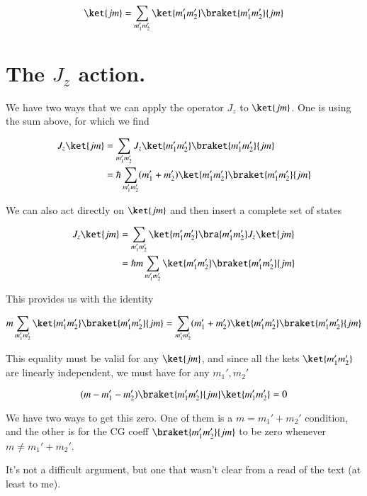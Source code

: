 \begin{equation}\label{eqn:ClebshGordan:70}
\ket{jm} = \sum_{m_1' m_2'} \ket{m_1' m_2'} \braket{m_1' m_2'}{jm}
\end{equation}

\section{The $J_z$ action.}

We have two ways that we can apply the operator $J_z$ to $\ket{jm}$.  One is using the sum above, for which we find

\begin{align*}
J_z \ket{jm} 
&= \sum_{m_1' m_2'} J_z \ket{m_1' m_2'} \braket{m_1' m_2'}{jm} \\
&= \hbar \sum_{m_1' m_2'} (m_1' + m_2') \ket{m_1' m_2'} \braket{m_1' m_2'}{jm} \\
\end{align*}

We can also act directly on $\ket{jm}$ and then insert a complete set of states

\begin{align*}
J_z \ket{jm} 
&=
\sum_{m_1' m_2'} 
\ket{m_1' m_2'}
\bra{m_1' m_2'}
J_z \ket{jm} \\
&=
\hbar m
\sum_{m_1' m_2'} 
\ket{m_1' m_2'}
\braket{m_1' m_2'}{jm} 
\\
\end{align*}

This provides us with the identity 

\begin{equation}\label{eqn:ClebshGordan:90}
m
\sum_{m_1' m_2'} 
\ket{m_1' m_2'}
\braket{m_1' m_2'}{jm} 
= \sum_{m_1' m_2'} (m_1' + m_2') \ket{m_1' m_2'} \braket{m_1' m_2'}{jm} 
\end{equation}

This equality must be valid for any $\ket{jm}$, and since all the kets $\ket{m_1' m_2'}$ are linearly independent, we must have for any $m_1', m_2'$

\begin{equation}\label{eqn:ClebshGordan:110}
(m - m_1' - m_2') \braket{m_1' m_2'}{jm} \ket{m_1' m_2'} = 0
\end{equation}

We have two ways to get this zero.  One of them is a $m = m_1' + m_2'$ condition, and the other is for the CG coeff $\braket{m_1' m_2'}{jm}$ to be zero whenever $m \ne m_1' + m_2'$.

It's not a difficult argument, but one that wasn't clear from a read of the text (at least to me).

\EndArticle

